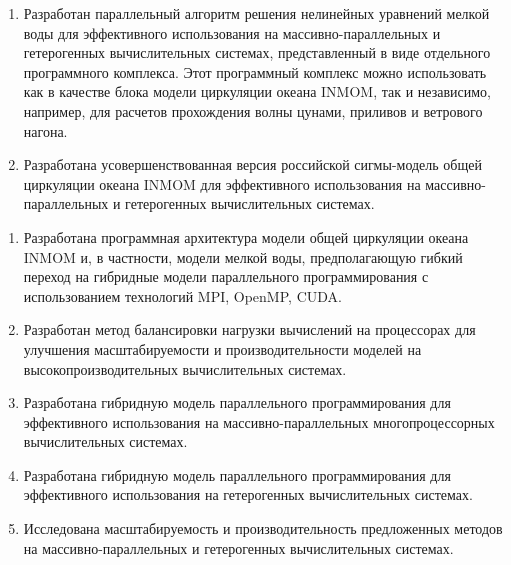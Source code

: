 \begin{enumerate}[beginpenalty=10000] %
    \item Разработан параллельный алгоритм решения нелинейных уравнений мелкой воды для эффективного использования на массивно-параллельных и гетерогенных вычислительных системах, представленный в виде отдельного программного комплекса. Этот программный комплекс можно использовать как в качестве блока модели циркуляции океана INMOM, так и независимо, например, для расчетов прохождения волны цунами, приливов и ветрового нагона.
    \item Разработана усовершенствованная версия российской сигмы-модель общей циркуляции океана INMOM для эффективного использования на массивно-параллельных и гетерогенных вычислительных системах.
\end{enumerate}



{}
\begin{enumerate}[beginpenalty=10000] %
    \item Разработана программная архитектура модели общей циркуляции океана INMOM и, в частности,  модели мелкой воды, предполагающую гибкий переход на гибридные модели параллельного программирования с использованием технологий MPI, OpenMP, CUDA.
    \item Разработан метод балансировки нагрузки вычислений на процессорах для улучшения масштабируемости и производительности моделей на высокопроизводительных вычислительных системах.
    \item Разработана гибридную модель параллельного программирования для эффективного использования на массивно-параллельных многопроцессорных вычислительных системах.
    \item Разработана гибридную модель параллельного программирования для эффективного использования на гетерогенных вычислительных системах.
    \item Исследована масштабируемость и производительность предложенных методов на массивно-параллельных и гетерогенных вычислительных системах. 
\end{enumerate}


